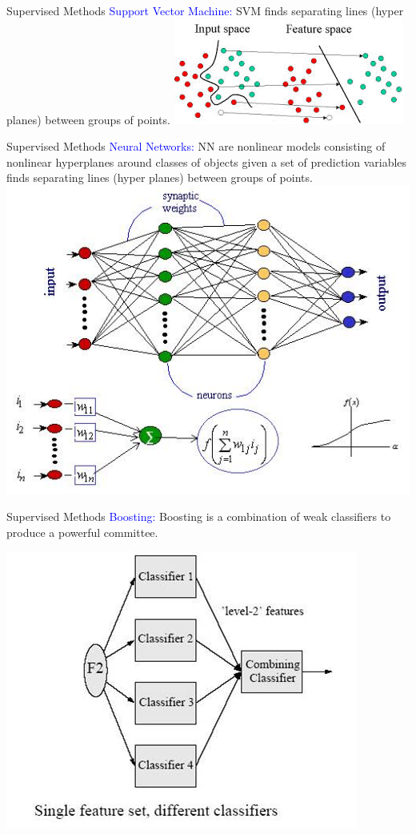 \documentclass[10pt,xcolor=dvipsnames]{beamer}\usepackage[]{graphicx}\usepackage[]{color}
\begin{document}
\begin{frame}{Supervised Methods}
\textcolor{blue}{Support Vector Machine:} SVM finds separating lines (hyper planes) between groups of points.
\bigskip
 \includegraphics{figures/svm.jpg}
\end{frame}


\begin{frame}{Supervised Methods}
\textcolor{blue}{Neural Networks:} NN are nonlinear models consisting of nonlinear hyperplanes around 
 classes of objects given a set of prediction variables finds separating lines (hyper planes) between groups of points.
 \includegraphics{figures/NN.jpg}
\end{frame}


\begin{frame}{Supervised Methods}
\textcolor{blue}{Boosting:} Boosting is a combination of weak classifiers to produce a 
   powerful committee. 

\bigskip
 \includegraphics{figures/boosting.jpg}
\end{frame}
\end{document}
